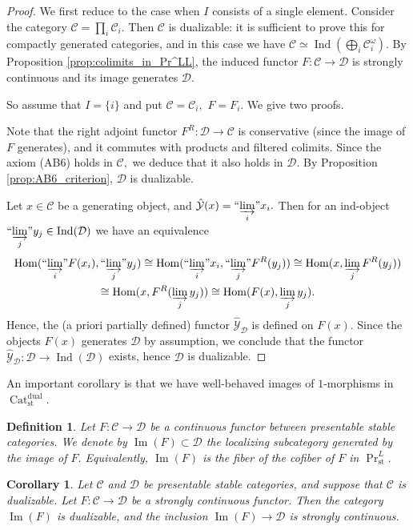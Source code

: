 \documentclass[11pt,leqno]{amsart}
\newtheorem{defi}[theo]{Definition}
\newtheorem{cor}[theo]{Corollary}
\numberwithin{equation}{section}
\def\Hom{\operatorname{Hom}}
\newcommand{\indlim}[1][]{\mathop{\varinjlim}\limits_{#1}}
\newcommand{\inddlim}[1][]{{``{\indlim[#1]}"}}
\newcommand{\biggplus}[1][]{\mathop{\bigoplus}\limits_{#1}}
\newcommand{\Cat}{\operatorname{Cat}}
\newcommand{\st}{\operatorname{st}}
\newcommand{\dual}{\operatorname{dual}}
\newcommand{\cD}{{\mathcal D}}
\newcommand{\cC}{{\mathcal C}}
\newcommand{\cY}{{\mathcal Y}}
\newcommand{\im}{\operatorname{Im}}
\newcommand{\Ind}{\operatorname{Ind}}
\begin{document}
\begin{proof} We first reduce to the case when $I$ consists of a single element. Consider the category $\cC=\prod_i\cC_i.$ Then $\cC$ is dualizable: it is sufficient to prove this for compactly generated categories, and in this case we have $\cC\simeq\Ind(\biggplus[i]\cC_i^{\omega}).$ By Proposition \ref{prop:colimits_in_Pr^LL}, the induced functor $F:\cC\to\cD$ is strongly continuous and its image generates $\cD.$

So assume that $I=\{i\}$ and put $\cC=\cC_i,$ $F=F_i.$ We give two proofs.

{} Note that the right adjoint functor $F^R:\cD\to\cC$ is conservative (since the image of $F$ generates), and it commutes with products and filtered colimits. Since the axiom (AB6) holds in $\cC,$ we deduce that it also holds in $\cD.$ By Proposition \ref{prop:AB6_criterion}, $\cD$ is dualizable.

{} Let $x\in \cC$ be a generating object, and $\hat{\cY}(x)=\inddlim[i]x_i.$ Then for an ind-object $\inddlim[j]y_j\in \Ind(\cD)$ we have an equivalence \begin{multline*}\Hom(\inddlim[i]F(x_i),\inddlim[j]y_j)\cong \Hom(\inddlim[i]x_i,\inddlim[j]F^R(y_j))\cong \Hom(x,\indlim[j] F^R(y_j))\\ \cong
\Hom(x,F^R(\indlim[j] y_j))\cong
 \Hom(F(x),\indlim[j] y_j).\end{multline*} Hence, the (a priori partially defined) functor $\hat{\cY}_{\cD}$ is defined on $F(x).$ Since the objects $F(x)$ generates $\cD$ by assumption, we conclude that the functor $\hat{\cY}_{\cD}:\cD\to \Ind(\cD)$ exists, hence $\cD$ is dualizable.\end{proof}

An important corollary is that we have well-behaved images of $1$-morphisms in $\Cat_{\st}^{\dual}.$

\begin{defi}\label{defi:image} Let $F:\cC\to\cD$ be a continuous functor between presentable stable categories. We denote by $\im(F)\subset\cD$ the localizing subcategory generated by the image of $F.$ Equivalently, $\im(F)$ is the fiber of the cofiber of $F$ in $\Pr^L_{\st}.$\end{defi}

\begin{cor}\label{cor:images_in_Cat^dual} Let $\cC$ and $\cD$ be presentable stable categories, and suppose that $\cC$ is dualizable. Let $F:\cC\to\cD$ be a strongly continuous functor. Then the category $\im(F)$ is dualizable, and the inclusion $\im(F)\to\cD$ is strongly continuous.\end{cor}
\end{document}
